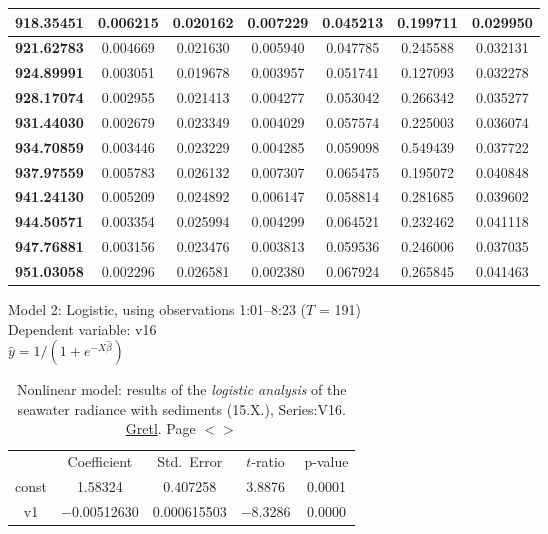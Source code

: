 \documentclass[11pt]{article}
\begin{document}
\begin{appendices}
\begin{longtable}{|c|c|c|c|c|c|c|}
	\textbf{918.35451} & 0.006215 & 0.020162 & 0.007229 & 0.045213 & 0.199711 & 0.029950 \\ \hline
	\textbf{921.62783} & 0.004669 & 0.021630 & 0.005940 & 0.047785 & 0.245588 & 0.032131 \\ \hline
	\textbf{924.89991} & 0.003051 & 0.019678 & 0.003957 & 0.051741 & 0.127093 & 0.032278 \\ \hline
	\textbf{928.17074} & 0.002955 & 0.021413 & 0.004277 & 0.053042 & 0.266342 & 0.035277 \\ \hline
	\textbf{931.44030} & 0.002679 & 0.023349 & 0.004029 & 0.057574 & 0.225003 & 0.036074 \\ \hline
	\textbf{934.70859} & 0.003446 & 0.023229 & 0.004285 & 0.059098 & 0.549439 & 0.037722 \\ \hline
	\textbf{937.97559} & 0.005783 & 0.026132 & 0.007307 & 0.065475 & 0.195072 & 0.040848 \\ \hline
	\textbf{941.24130} & 0.005209 & 0.024892 & 0.006147 & 0.058814 & 0.281685 & 0.039602 \\ \hline
	\textbf{944.50571} & 0.003354 & 0.025994 & 0.004299 & 0.064521 & 0.232462 & 0.041118 \\ \hline
	\textbf{947.76881} & 0.003156 & 0.023476 & 0.003813 & 0.059536 & 0.246006 & 0.037035 \\ \hline
	\textbf{951.03058} & 0.002296 & 0.026581 & 0.002380 & 0.067924 & 0.265845 & 0.041463 \\ \hline
\end{longtable}
 
\begin{table}[H]
	\caption{Nonlinear model: results of the \textit{logistic analysis} of the seawater radiance with sediments (15.X.), Series:V16. \href{http://gretl.sourceforge.net/}{Gretl}. Page $<$\pageref{page-41}$>$}
	\begin{center}
	Model 2: Logistic, using observations 1:01--8:23 ($T$ = 191)\\
	Dependent variable: v16\\
	$\hat{y} = 1 / (1 + e^{-X\hat{\beta}})$
	
	\vspace{1em}
	\begin{tabular}{|c|c|c|c|c|}
		  & {Coefficient} & {Std.\ Error} & {$t$-ratio} & {p-value} \\[1ex]
		const &  1.58324 &     0.407258 &       3.8876 &         0.0001 \\
		v1 &   $-$0.00512630 &     0.000615503 &       $-$8.3286 &         0.0000 \\
	\end{tabular}


\end{center}
\end{table}
\end{appendices}
\end{document}
